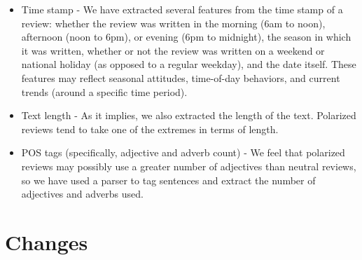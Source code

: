 \documentclass[12pt]{article}
\begin{document}
\begin{enumerate}
\begin{itemize}
\item Time stamp - We have extracted several features from the time stamp of a review: whether the review was written in the morning (6am to noon), afternoon (noon to 6pm), or evening (6pm to midnight), the season in which it was written, whether or not the review was written on a weekend or national holiday (as opposed to a regular weekday), and the date itself. These features may reflect seasonal attitudes, time-of-day behaviors, and current trends (around a specific time period).

\item Text length - As it implies, we also extracted the length of the text. Polarized reviews tend to take one of the extremes in terms of length.

\item POS tags (specifically, adjective and adverb count) - We feel that polarized reviews may possibly use a greater number of adjectives than neutral reviews, so we have used a parser to tag sentences and extract the number of adjectives and adverbs used.

\end{itemize}
    
\end{enumerate}

\section*{Changes}
\end{document}
